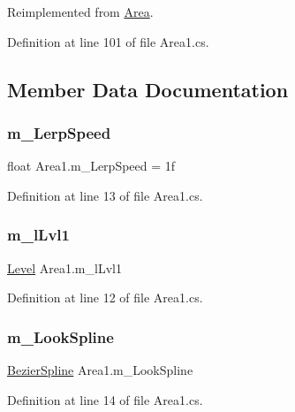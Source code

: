 Reimplemented from \mbox{\hyperlink{class_area_a0f04f37327aab840cc0d4ba97c7d19ff}{Area}}.



Definition at line 101 of file Area1.\+cs.



\subsection{Member Data Documentation}
\mbox{\label{class_area1_a2f8e8916829e951428da6cad8b8e0bef}} 
\subsubsection{\texorpdfstring{m\+\_\+\+Lerp\+Speed}{m\_LerpSpeed}}
{\footnotesize\ttfamily float Area1.\+m\+\_\+\+Lerp\+Speed = 1f}



Definition at line 13 of file Area1.\+cs.

\mbox{\label{class_area1_a8d69d7173c24501c807a8c01e7579085}} 
\subsubsection{\texorpdfstring{m\+\_\+l\+Lvl1}{m\_lLvl1}}
{\footnotesize\ttfamily \mbox{\hyperlink{class_level}{Level}} Area1.\+m\+\_\+l\+Lvl1}



Definition at line 12 of file Area1.\+cs.

\mbox{\label{class_area1_a656bd1b3723ae1ace1ccba171b6fe178}} 
\subsubsection{\texorpdfstring{m\+\_\+\+Look\+Spline}{m\_LookSpline}}
{\footnotesize\ttfamily \mbox{\hyperlink{class_bezier_spline}{Bezier\+Spline}} Area1.\+m\+\_\+\+Look\+Spline}



Definition at line 14 of file Area1.\+cs.

